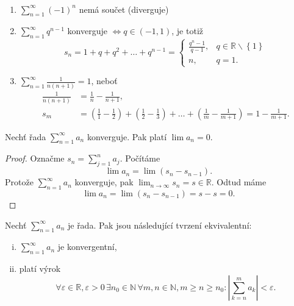 \begin{priklad}\,
\begin{enumerate}[(1)]
	\item $\sum_{n=1}^\infty (-1)^n$ nemá součet (diverguje)
	\item $\sum_{n=1}^\infty q^{n-1}$ konverguje $\iff q \in (-1,1)$, je totiž
	$$
	    s_n = 1+q+q^2+\dots + q^{n-1}= \begin{cases}
					\frac{q^n-1}{q-1}, & q \in \mathbb R  \smallsetminus \left \{ 1 \right \}\\
				 n, & q=1.
					\end{cases}
	$$
	\item $\sum_{n=1}^\infty \frac{1}{n(n+1)}=1$, neboť
	\begin{align*}
	\frac{1}{n(n+1)} &= \frac{1}{n}-\frac{1}{n+1},\\
	s_m &= \left (\frac{1}{1} - \frac{1}{2}\right) + \left( \frac{1}{2} - \frac{1}{3} \right ) + \dots + \left( \frac{1}{m} - \frac{1}{m+1}\right ) = 1 - \frac{1}{m+1} .
\end{align*}
\end{enumerate}
\end{priklad}

\begin{veta} \label{veta7.1}
Nechť řada $\sum_{n=1}^\infty a_n$ konverguje. Pak platí $\lim a_n=0$.
\end{veta}

\begin{proof}
	Označme $s_n = \sum_{j=1}^n a_j$. Počítáme
	$$
 \lim a_n = \lim (s_n - s_{n-1}).
	$$
	Protože $\sum_{n=1}^\infty a_n$ konverguje, pak $\lim_{n \to \infty} s_n = s \in \mathbb R $.
	Odtud máme
	$$
	\lim a_n = \lim (s_n - s_{n-1}) = s - s = 0.
	$$
\end{proof}

\begin{veta} \label{7.2}
Nechť $\sum_{n=1}^\infty a_n$ je řada. Pak jsou následující tvrzení ekvivalentní:
\begin{enumerate}[(i)]
	\item $\sum_{n=1}^\infty a_n$ je konvergentní,
	\item platí výrok
	\[
\forall \varepsilon \in \mathbb R , \varepsilon>0 \, \exists n_0\in \mathbb N  \, \forall m, n\in \mathbb N , m\ge n\ge n_0:\left| \sum_{k=n}^m a_k \right| < \varepsilon.
\]
\end{enumerate}
\end{veta}

